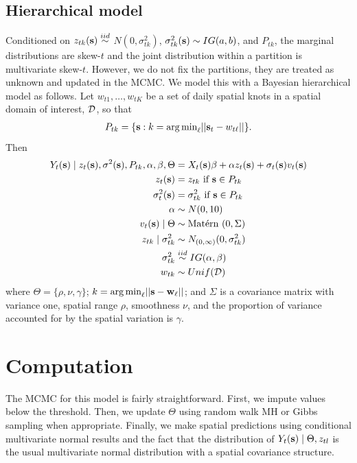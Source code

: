 \documentclass[11pt]{article}
\begin{document}
\subsection{Hierarchical model}\label{s:hier}
Conditioned on $z_{tk}(\mbox{\bf s}) \stackrel{iid}{\sim} $ $N(0, \sigma^2_{tk})$, $\sigma^2_{tk}(\mbox{\bf s}) \sim IG(a, b)$, and $P_{tk}$, the marginal distributions are skew-$t$ and the joint distribution within a partition is multivariate skew-$t$.
However, we do not fix the partitions, they are treated as unknown and updated in the MCMC.
We model this with a Bayesian hierarchical model as follows.
Let $w_{t1}, \ldots, w_{tK}$ be a set of daily spatial knots in a spatial domain of interest, ${\cal D}$, so that
\begin{align*}
 P_{tk} = \{\mbox{\bf s} : k = {\mathop{\rm arg\, min}}_\ell || \mbox{\bf s}_t - w_{t\ell} ||\}.
\end{align*}
Then
\begin{align}
   Y_t(\mbox{\bf s}) \mid z_{t}(\mbox{\bf s}), \sigma^2(\mbox{\bf s}), P_{tk}, \alpha, \beta, \Theta &= X_t(\mbox{\bf s}) \beta + \alpha z_t(\mbox{\bf s}) + \sigma_t(\mbox{\bf s}) v_t(\mbox{\bf s}) \label{eq:hier}\\
   z_t(\mbox{\bf s}) &= z_{tk} \text{ if } \mbox{\bf s} \in P_{tk}\\
   \sigma^2_{t}(\mbox{\bf s}) &= \sigma^2_{tk} \text{ if } \mbox{\bf s} \in P_{tk}\\
   \alpha &\sim N(0, 10)\\
   v_t(\mbox{\bf s}) \mid \Theta &\sim \mbox{Mat$\acute{\mbox{e}}$rn }(0, \Sigma)\\
   z_{tk} \mid \sigma^2_{tk} &\sim N_{(0, \infty)}(0, \sigma^2_{tk})\\
   \sigma^2_{tk} &\stackrel{iid}{\sim} IG(\alpha, \beta)\\   
   w_{tk} &\sim Unif({\cal D})
\end{align}
where $\Theta = \{\rho, \nu, \gamma\}$; \mbox{$k = {\mathop{\rm arg\, min}}_\ell ||\mbox{\bf s} - \mbox{\bf w}_\ell ||$}; and $\Sigma$ is a \Matern covariance matrix with variance one, spatial range $\rho$, smoothness $\nu$, and the proportion of variance accounted for by the spatial variation is $\gamma$.

\section{Computation}\label{s:comp}
The MCMC for this model is fairly straightforward.
First, we impute values below the threshold.
Then, we update $\Theta$ using random walk MH or Gibbs sampling when appropriate.
Finally, we make spatial predictions using conditional multivariate normal results and the fact that the distribution of $Y_t(\mbox{\bf s}) \mid \Theta, z_{tl}$ is the usual multivariate normal distribution with a \Matern spatial covariance structure.
\end{document}
